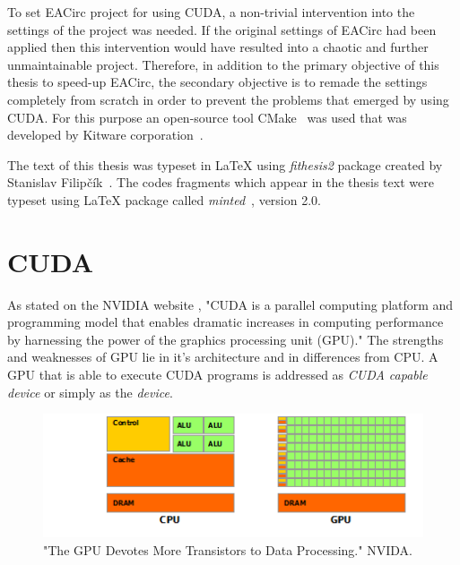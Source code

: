 \documentclass[12pt,oneside]{fithesis2}
\begin{document}
\bigskip

To set EACirc project for using CUDA, a non-trivial intervention into the settings of the project was needed. If the original settings of EACirc had been applied then this intervention would have resulted into a chaotic and further unmaintainable project. Therefore, in addition to the primary objective of this thesis to speed-up EACirc, the secondary objective is to remade the settings completely from scratch in order to prevent the problems that emerged by using CUDA. For this purpose an open-source tool CMake~\cite{cmake} was used that was developed by Kitware corporation~\cite{kitware}.

\bigskip

The text of this thesis was typeset in \LaTeX{} using \textit{fithesis2} package created by Stanislav Filipčík~\cite{fithesis}. The codes fragments which appear in the thesis text were typeset using \LaTeX{} package called \textit{minted}~\cite{minted}, version 2.0.





\chapter{CUDA}
As stated on the NVIDIA website \cite{about_cuda}, "CUDA is a parallel computing platform and programming model that enables dramatic increases in computing performance by harnessing the power of the graphics processing unit (GPU)." The strengths and weaknesses of GPU lie in it's architecture and in differences from CPU. A GPU that is able to execute CUDA programs is addressed as \emph{CUDA capable device} or simply as the \emph{device}.

\begin{figure}[H]
	\centering
	\includegraphics{figures/gpu-devotes-more-transistors-to-data-processing.png}
	\caption{"The GPU Devotes More Transistors to Data Processing." NVIDA. \cite{cuda_guide}}
	\label{fig:cpu_vs_gpu_arch}
\end{figure}
\end{document}
